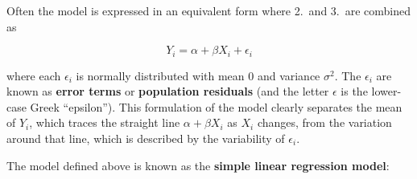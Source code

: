 \documentclass[11pt,a4paper,openany]{book}
\begin{document}
Often the model is expressed in an equivalent form where 2.~and 3.~are
combined as

\begin{equation}Y_{i}=\alpha+\beta X_{i} +\epsilon_{i}
\label{eq:slinmodel}\end{equation}

where each \(\epsilon_{i}\) is normally distributed with mean 0 and
variance \(\sigma^{2}\). The \(\epsilon_{i}\) are known as \textbf{error
terms} or \textbf{population residuals} (and the letter \(\epsilon\) is
the lower-case Greek ``epsilon''). This formulation of the model clearly
separates the mean of \(Y_{i}\), which traces the straight line
\(\alpha+\beta X_{i}\) as \(X_{i}\) changes, from the variation around
that line, which is described by the variability of \(\epsilon_{i}\).

The model defined above is known as the \textbf{simple linear regression
model}:
\end{document}
